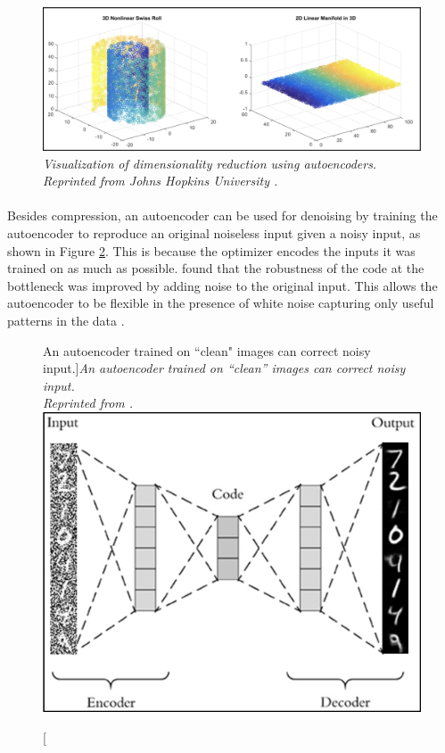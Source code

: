 \begin{figure}[H]
  \centering
  \caption[Visualization of dimensionality reduction using autoencoders.]{\emph{Visualization of dimensionality reduction using autoencoders. \\ 
  Reprinted from Johns Hopkins University \citeyear{johns_hopkins_university_2015}.}}\label{fig:ae_f_reduction}
  \includegraphics[scale = 0.2]{figures/ae_f_reduction.jpg}  
\end{figure}

\paragraph{}
Besides compression, an autoencoder can be used for denoising by training the autoencoder to reproduce an original noiseless input given a noisy input, as shown in Figure \ref{fig:ae_2}. This is because the optimizer encodes the inputs it was trained on as much as possible. \citeauthor{vincent_larochelle_bengio_manzagol_2008} \citeyear{vincent_larochelle_bengio_manzagol_2008} found that the robustness of the code at the bottleneck was improved by adding noise to the original input. This allows the autoencoder to be flexible in the presence of white noise capturing only useful patterns in the data \cite{vincent10a}.


\begin{figure}[H]
  \centering
  \caption[An autoencoder trained on ``clean" images can correct noisy input.]{\emph{An autoencoder trained on ``clean'' images can correct noisy input. \\
  Reprinted from \citeauthor{rosebrock_2020} \citeyear{rosebrock_2020}.}}\label{fig:ae_2}
  \includegraphics[scale = 0.4]{figures/ae_2.jpg}  
\end{figure}

